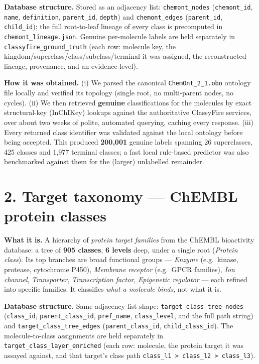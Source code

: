 \documentclass[11pt]{article}
\newcommand{\code}[1]{\texttt{\small #1}}
\begin{document}
\textbf{Database structure.} Stored as an adjacency list:
\code{chemont\_nodes} (\code{chemont\_id}, \code{name}, \code{definition}, \code{parent\_id},
\code{depth}) and \code{chemont\_edges} (\code{parent\_id}, \code{child\_id}); the full
root-to-leaf lineage of every class is precomputed in \code{chemont\_lineage.json}. Genuine
per-molecule labels are held separately in \code{classyfire\_ground\_truth} (each row: molecule
key, the kingdom/superclass/class/subclass/terminal it was assigned, the reconstructed lineage,
provenance, and an evidence level).

\textbf{How it was obtained.} (i) We parsed the canonical \code{ChemOnt\_2\_1.obo} ontology file
locally and verified its topology (single root, no multi-parent nodes, no cycles). (ii) We then
retrieved \textbf{genuine} classifications for the molecules by exact structural-key (InChIKey)
lookups against the authoritative ClassyFire services, over about two weeks of polite, automated
querying, caching every response. (iii) Every returned class identifier was validated against the
local ontology before being accepted. This produced \textbf{200{,}001} genuine labels spanning
26 superclasses, 425 classes and 1{,}977 terminal classes; a fast local rule-based predictor was
also benchmarked against them for the (larger) unlabelled remainder.

\section*{2. Target taxonomy --- ChEMBL protein classes}
\textbf{What it is.} A hierarchy of \emph{protein target families} from the ChEMBL bioactivity
database: a tree of \textbf{905 classes}, \textbf{6 levels} deep, under a single root
(\emph{Protein class}). Its top branches are broad functional groups --- \emph{Enzyme}
(e.g.\ kinase, protease, cytochrome P450), \emph{Membrane receptor} (e.g.\ GPCR families),
\emph{Ion channel}, \emph{Transporter}, \emph{Transcription factor}, \emph{Epigenetic
regulator} --- each refined into specific families. It classifies \emph{what a molecule binds},
not what it is.

\textbf{Database structure.} Same adjacency-list shape: \code{target\_class\_tree\_nodes}
(\code{class\_id}, \code{parent\_class\_id}, \code{pref\_name}, \code{class\_level}, and the full
path string) and \code{target\_class\_tree\_edges} (\code{parent\_class\_id},
\code{child\_class\_id}). The molecule-to-class assignments are held separately in
\code{target\_class\_layer\_enriched} (each row: molecule, the protein target it was assayed
against, and that target's class path \code{class\_l1 > class\_l2 > class\_l3}).
\end{document}
